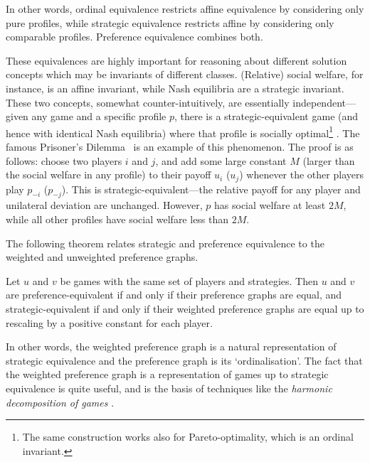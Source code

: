 \documentclass[preprint,authoryear]{elsarticle}
\begin{document}
In other words, ordinal equivalence restricts affine equivalence by considering only pure profiles, while strategic equivalence restricts affine by considering only comparable profiles. Preference equivalence combines both. 
\begin{rmk}
    These equivalences are highly important for reasoning about different solution concepts which may be invariants of different classes. (Relative) social welfare, for instance, is an affine invariant, while Nash equilibria are a strategic invariant. These two concepts, somewhat counter-intuitively, are essentially independent---given any game and a specific profile $p$, there is a strategic-equivalent game (and hence with identical Nash equilibria) where that profile is socially optimal\footnote{The same construction works also for Pareto-optimality, which is an ordinal invariant.} \citep{biggarthesis}. The famous Prisoner's Dilemma~\cite{myerson1997game} is an example of this phenomenon. The proof is as follows: choose two players $i$ and $j$, and add some large constant $M$ (larger than the social welfare in any profile) to their payoff $u_i$ ($u_j$) whenever the other players play $p_{-i}$ ($p_{-j}$). This is strategic-equivalent---the relative payoff for any player and unilateral deviation are unchanged. However, $p$ has social welfare at least $2M$, while all other profiles have social welfare less than $2M$.
\end{rmk}

The following theorem relates strategic and preference equivalence to the weighted and unweighted preference graphs.

\begin{thm}
    Let $u$ and $v$ be games with the same set of players and strategies. Then $u$ and $v$ are preference-equivalent if and only if their preference graphs are equal, and strategic-equivalent if and only if their weighted preference graphs are equal up to rescaling by a positive constant for each player.
\end{thm}

In other words, the weighted preference graph is a natural representation of strategic equivalence and the preference graph is its `ordinalisation'. %
The fact that the weighted preference graph is a representation of games up to strategic equivalence is quite useful, and is the basis of techniques like the \emph{harmonic decomposition of games} \citep{candogan_flows_2011,hwang_strategic_2020}. 
\end{document}
